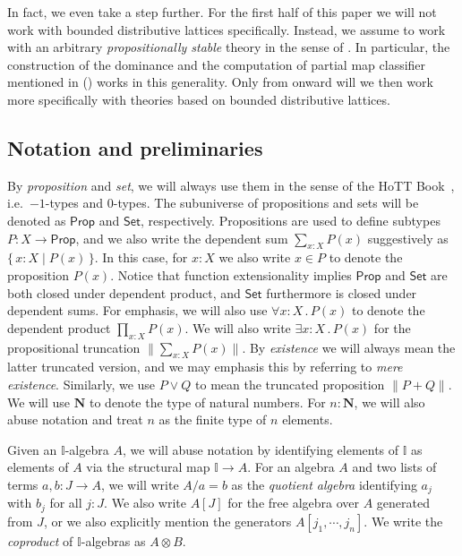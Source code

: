 \documentclass[a4paper,12pt]{amsart}
\theoremstyle{definition}
\newcommand{\mb}[1]{\mathbf{#1}}
\newcommand{\mbb}[1]{\mathbb{#1}}
\newcommand{\I}{\mbb I}
\newcommand{\ms}[1]{\mathsf{#1}}
\newcommand{\scomp}[2]{\{\,#1\mid#2\,\}}
\newcommand{\N}{\mb N}
\newcommand{\fa}[2]{\forall #1\!\colon\!\!#2\mathpunct{.}}
\newcommand{\ex}[2]{\exists #1\!\colon\!\!#2\mathpunct{.}}
\newcommand{\pss}[1]{\lVert #1\rVert} %
\newcommand{\pp}{\ms{Prop}}
\newcommand{\st}{\ms{Set}}
\begin{document}
In fact, we even take a step further. For the first half of this paper we will not work with bounded distributive lattices specifically. Instead, we assume to work with an arbitrary \emph{propositionally stable} theory in the sense of . In particular, the construction of the dominance and the computation of partial map classifier mentioned in  () works in this generality. Only from  onward will we then work more specifically with theories based on bounded distributive lattices.

\subsection*{Notation and preliminaries}

By \emph{proposition} and \emph{set}, we will always use them in the sense of the HoTT Book~\cite{hottbook}, i.e.\ $-1$-types and $0$-types. The subuniverse of propositions and sets will be denoted as $\pp$ and $\st$, respectively. Propositions are used to define subtypes $P \colon X \to \pp$, and we also write the dependent sum $\sum_{x:X}P(x)$ suggestively as $\scomp{x:X}{P(x)}$. In this case, for $x:X$ we also write $x\in P$ to denote the proposition $P(x)$. Notice that function extensionality implies $\pp$ and $\st$ are both closed under dependent product, and $\st$ furthermore is closed under dependent sums. For emphasis, we will also use $\fa xXP(x)$ to denote the dependent product $\prod_{x:X}P(x)$. We will also write $\ex xXP(x)$ for the propositional truncation $\pss{\sum_{x:X}P(x)}$. By \emph{existence} we will always mean the latter truncated version, and we may emphasis this by referring to \emph{mere existence}. Similarly, we use $P \vee Q$ to mean the truncated proposition $\pss{P + Q}$. We will use $\N$ to denote the type of natural numbers. For $n:\N$, we will also abuse notation and treat $n$ as the finite type of $n$ elements. 

Given an $\I$-algebra $A$, we will abuse notation by identifying elements of $\I$ as elements of $A$ via the structural map $\I \to A$. For an algebra $A$ and two lists of terms $a,b \colon J \to A$, 
we will write $A/a = b$ as the \emph{quotient algebra} identifying $a_j$ with $b_j$ for all $j : J$. We also write $A[J]$ for the free algebra over $A$ generated from $J$, or we also explicitly mention the generators $A[j_1,\cdots,j_n]$. We write the \emph{coproduct} of $\I$-algebras as $A \otimes B$.
\end{document}
